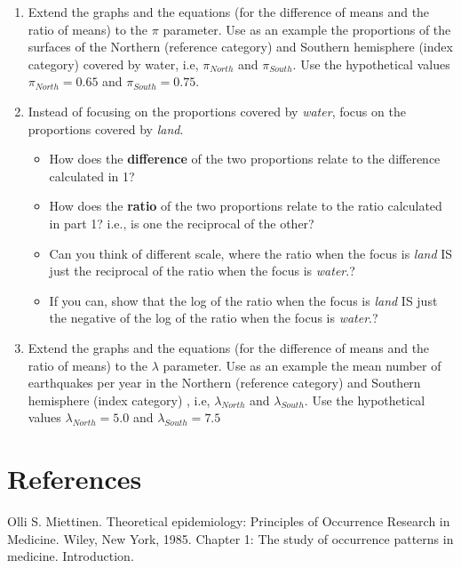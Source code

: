 \documentclass[]{book}
\begin{document}
\begin{enumerate}
\def\labelenumi{\arabic{enumi}.}
\item
  Extend the graphs and the equations (for the difference of means and the ratio of means) to the \(\pi\) parameter. Use as an example the proportions of the surfaces of the Northern (reference category) and Southern hemisphere (index category) covered by water, i.e, \(\pi_{North}\) and \(\pi_{South}.\) Use the hypothetical values \(\pi_{North} = 0.65\) and \(\pi_{South} = 0.75.\)
\item
  Instead of focusing on the proportions covered by \emph{water}, focus on the proportions covered by \emph{land}.

  \begin{itemize}
  \item
    How does the \textbf{difference} of the two proportions relate to the difference calculated in 1?
  \item
    How does the \textbf{ratio} of the two proportions relate to the ratio calculated in part 1? i.e., is one the reciprocal of the other?
  \item
    Can you think of different scale, where the ratio when the focus is \emph{land} IS just the reciprocal of the ratio when the focus is \emph{water}.?
  \item
    If you can, show that the log of the ratio when the focus is \emph{land} IS just the negative of the log of the ratio when the focus is \emph{water}.?
  \end{itemize}
\item
  Extend the graphs and the equations (for the difference of means and the ratio of means) to the \(\lambda\) parameter. Use as an example the mean number of earthquakes per year in the Northern (reference category) and Southern hemisphere (index category) , i.e, \(\lambda_{North}\) and \(\lambda_{South}.\) Use the hypothetical values \(\lambda_{North} = 5.0\) and \(\lambda_{South} = 7.5\)
\end{enumerate}

\hypertarget{references-1}{%
\section{References}\label{references-1}}

Olli S. Miettinen. Theoretical epidemiology: Principles of Occurrence Research in Medicine. Wiley, New York, 1985.
Chapter 1: The study of occurrence patterns in medicine. Introduction.
\end{document}
